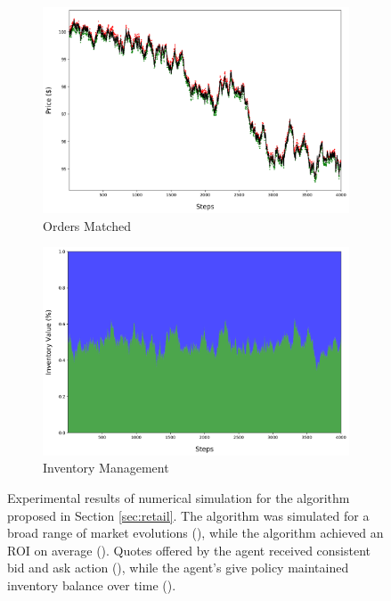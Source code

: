 \documentclass{article}
\begin{document}
\begin{figure}
\begin{subfigure}[b]{0.475\textwidth}
        \includegraphics[width=\textwidth]{orders.png}
        \caption[Orders Matched]
        {{Orders Matched}}    
        \label{fig:ex1-orders}
    \end{subfigure}
    \quad
    \begin{subfigure}[b]{0.475\textwidth}   
        \centering 
        \includegraphics[width=\textwidth]{inventory.png}
        \caption[Inventory Management]
        {{Inventory Management}}
        \label{fig:ex1-inventory}
    \end{subfigure}
    \caption{
      Experimental results of numerical simulation for the algorithm proposed in Section \ref{sec:retail}. The algorithm was simulated for a broad range of market evolutions (), while the algorithm achieved an ROI on average (). Quotes offered by the agent received consistent bid and ask action (), while the agent's give policy maintained inventory balance over time ().
    }
    \label{fig:ex1}
\end{figure}
\end{document}
